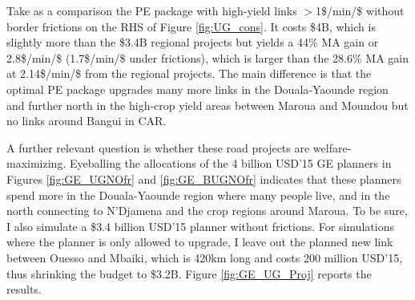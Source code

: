 \documentclass[a4paper]{article}
\begin{document}

Take as a comparison the PE package with high-yield links $>$1\$/min/\$ without border frictions on the RHS of Figure \ref{fig:UG_cons}. It costs \$4B, which is slightly more than the \$3.4B regional projects but yields a 44\% MA gain or 2.8\$/min/\$ (1.7\$/min/\$ under frictions), which is larger than the 28.6\% MA gain at 2.14\$/min/\$ from the regional projects. The main difference is that the optimal PE package upgrades many more links in the Douala-Yaounde region and further north in the high-crop yield areas between Maroua and Moundou but no links around Bangui in CAR. \newline 

A further relevant question is whether these road projects are welfare-maximizing. Eyeballing the allocations of the 4 billion USD'15 GE planners in Figures \ref{fig:GE_UGNOfr} and \ref{fig:GE_BUGNOfr} indicates that these planners spend more in the Douala-Yaounde region where many people live, and in the north connecting to N'Djamena and the crop regions around Maroua. To be sure, I also simulate a \$3.4 billion USD'15 planner without frictions. For simulations where the planner is only allowed to upgrade, I leave out the planned new link between Ouesso and Mbaiki, which is 420km long and costs 200 million USD'15, thus shrinking the budget to \$3.2B. Figure \ref{fig:GE_UG_Proj} reports the results. 
\end{document}

